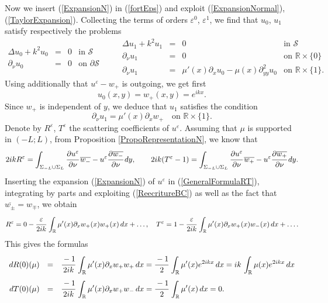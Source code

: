 \documentclass[11pt,a4paper]{report}
\newcommand{\dsp}{\displaystyle}
\newcommand{\eps}{\varepsilon}
\newcommand{\R}{\mathbb{R}}
\begin{document}
Now we insert (\ref{ExpansionN}) in (\ref{fortEps}) and exploit  (\ref{ExpansionNormal}), (\ref{TaylorExpansion}). Collecting the terms of orders $\eps^0$, $\eps^1$, we find that $u_0$, $u_1$ satisfy respectively the problems
\[
\begin{array}{|rccl}
\Delta u_0 + k^2u_0 &=& 0&  \mbox{in }\mathcal{S}\\[3pt]
\partial_{\nu} u_0&=&0 & \mbox{on } \partial\mathcal{S}
\end{array}\qquad \begin{array}{|rccl}
\Delta u_1 + k^2u_1 &=& 0&  \mbox{in } \mathcal{S}\\[3pt]
\partial_{\nu} u_1&=&0 & \mbox{on } \R\times\{0\}\\[3pt]
\partial_{\nu} u_1&=& \mu'(x)\partial_x u_0-\mu(x)\partial^2_{yy}u_0 & \mbox{on }\R\times\{1\}.
\end{array}
\]
Using additionally that $u^\eps-w_+$ is outgoing, we get first 
\[
u_0(x,y)=w_+(x,y)=e^{ikx}.
\]
Since $w_+$ is independent of $y$, we deduce that $u_1$ satisfies the condition
\begin{equation}\label{ReecritureBC}
\partial_{\nu} u_1= \mu'(x)\partial_x w_+\quad \mbox{on }\R\times\{1\}.
\end{equation}
Denote by $R^\eps$, $T^\eps$ the scattering coefficients of $u^\eps$. Assuming that $\mu$ is supported in $(-L;L)$, from Proposition \ref{PropoRepresentationN}, we know that 
\begin{equation}\label{GeneralFormulaRT}
2ikR^\eps=\int_{\Sigma_{-L}\cup \Sigma_{L}}\cfrac{\partial u^\eps}{\partial\nu}\, \overline{w_-}-u^\eps \cfrac{\partial \overline{w_-}}{\partial\nu}\,dy,\qquad 2ik(T^\eps-1)=\int_{\Sigma_{-L}\cup \Sigma_{L}}\cfrac{\partial u^\eps}{\partial\nu}\,\overline{w_+}-u^\eps \cfrac{\partial \overline{w_+}}{\partial\nu}\,dy.
\end{equation}
Inserting the expansion (\ref{ExpansionN}) of $u^\eps$ in (\ref{GeneralFormulaRT}), integrating by parts and exploiting (\ref{ReecritureBC}) as well as the fact that $\overline{w_\pm}=w_\mp$, we obtain
\[
R^\eps=0-\cfrac{\eps}{2ik}\,\int_{\R}\mu'(x)\partial_xw_+(x) w_+(x)\,dx+\dots,\quad T^\eps=1-\cfrac{\eps}{2ik}\,\int_{\R}\mu'(x)\partial_xw_+(x)w_-(x)\,dx+\dots.
\]
This gives the formulas
\begin{equation}\label{ExpressDiffSNeumann}
\begin{array}{rcl}
dR(0)(\mu)&=&\dsp\cfrac{-1}{2ik}\,\int_{\R}\mu'(x)\partial_xw_+ w_+\,dx=\cfrac{-1}{2}\,\int_{\R}\mu'(x) e^{2ikx}\,dx=ik\,\int_{\R}\mu(x)e^{2ikx}\,dx\\[12pt]
dT(0)(\mu)&=&\dsp\cfrac{-1}{2ik}\,\int_{\R}\mu'(x)\partial_xw_+ w_-\,dx=\cfrac{-1}{2}\,\int_{\R}\mu'(x)\,dx=0.
\end{array}
\end{equation}
\end{document}
